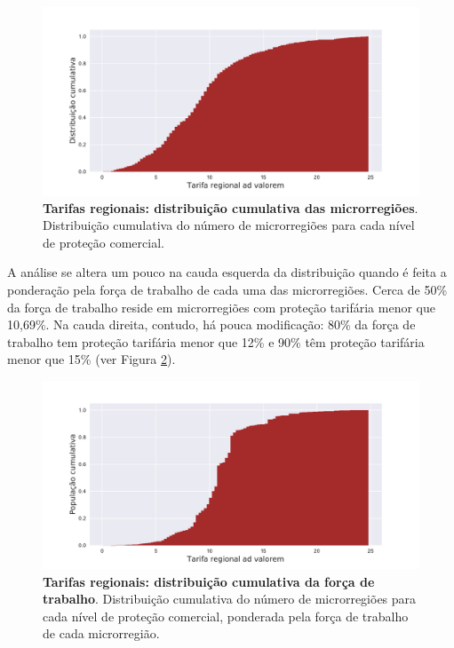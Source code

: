 \documentclass{article}
\begin{document}
\begin{figure}[ht!]
    \centering
    \includegraphics[scale=0.55]{rtr_hist.pdf}
    \caption[Tarifas regionais: distribuição cumulativa das microrregiões]{\textbf{Tarifas regionais: distribuição cumulativa das microrregiões}. Distribuição cumulativa do número de microrregiões para cada nível de proteção comercial.}
    \label{fig:rtr_hist}
\end{figure}

A análise se altera um pouco na cauda esquerda da distribuição quando é feita a ponderação pela força de trabalho de cada uma das microrregiões. Cerca de 50\% da força de trabalho reside em microrregiões com proteção tarifária menor que 10,69\%. Na cauda direita, contudo, há pouca modificação: 80\% da força de trabalho tem proteção tarifária menor que 12\% e 90\% têm proteção tarifária menor que 15\% (ver Figura \ref{fig:rtr_hist_w}).

\newpage

\begin{figure}[htbp!]
    \centering
    \includegraphics[scale=0.55]{rtr_hist_w.pdf}
    \caption[Tarifas regionais: distribuição cumulativa da força de trabalho]{\textbf{Tarifas regionais: distribuição cumulativa da força de trabalho}. Distribuição cumulativa do número de microrregiões para cada nível de proteção comercial, ponderada pela força de trabalho de cada microrregião.}
    \label{fig:rtr_hist_w}
\end{figure}
\end{document}

